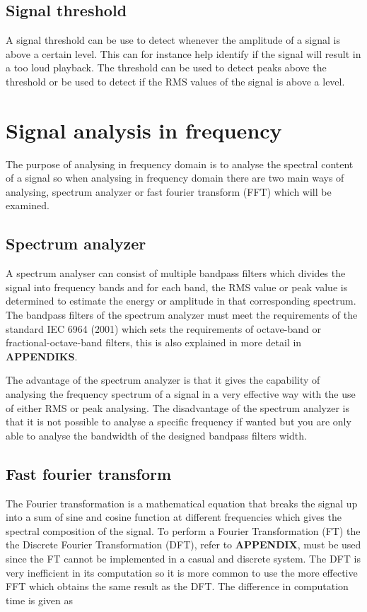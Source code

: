 \subsection*{Signal threshold}
A signal threshold can be use to detect whenever the amplitude of a signal is above a certain level. This can for instance help identify if the signal will result in a too loud playback. The threshold can be used to detect peaks above the threshold or be used to detect if the RMS values of the signal is above a level.

\section{Signal analysis in frequency} \label{sec:SignalFreq}
The purpose of analysing in frequency domain is to analyse the spectral content of a signal so when analysing in frequency domain there are two main ways of analysing, spectrum analyzer or fast fourier transform (FFT) which will be examined.

\subsection*{Spectrum analyzer}
A spectrum analyser can consist of multiple bandpass filters which divides the signal into frequency bands and for each band, the RMS value or peak value is determined to estimate the energy or amplitude in that corresponding spectrum. The bandpass filters of the spectrum analyzer must meet the requirements of the standard IEC 6964 (2001) which sets the requirements of octave-band or fractional-octave-band filters, this is also explained in more detail in \textbf{APPENDIKS}.  

The advantage of the spectrum analyzer is that it gives the capability of analysing the frequency spectrum of a signal in a very effective way with the use of either RMS or peak analysing. The disadvantage of the spectrum analyzer is that it is not possible to analyse a specific frequency if wanted but you are only able to analyse the bandwidth of the designed bandpass filters width.      


\subsection*{Fast fourier transform}

The Fourier transformation is a mathematical equation that breaks the signal up into a sum of sine and cosine function at different frequencies which gives the spectral composition of the signal. To perform a Fourier Transformation (FT) the the Discrete Fourier Transformation (DFT), refer to \textbf{APPENDIX}, must be used since the FT cannot be implemented in a casual and discrete system. The DFT is very inefficient in its computation so it is more common to use the more effective FFT which obtains the same result as the DFT. The difference in computation time is given as

